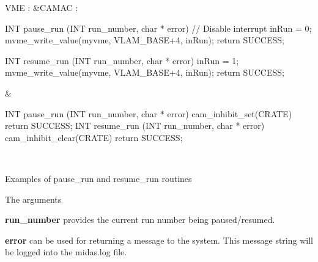 \begin{table}[h]\begin{TabularC}{2}
\hline
VME :  &CAMAC :  \\

\begin{DoxyCode}
INT pause_run (INT run_number, char * error)
{
 // Disable interrupt
  inRun = 0;
  mvme_write_value(myvme, VLAM_BASE+4, inRun);
   return SUCCESS;
}

INT resume_run (INT run_number, char * error)
{
 inRun = 1;
 mvme_write_value(myvme, VLAM_BASE+4, inRun);
   return SUCCESS;
}
\end{DoxyCode}
  &
\begin{DoxyCode}
INT pause_run (INT run_number, char * error)
{
   cam_inhibit_set(CRATE)
   return SUCCESS;
}
INT resume_run (INT run_number, char * error)
{
   cam_inhibit_clear(CRATE)
   return SUCCESS;
}  
\end{DoxyCode}


\\
\end{TabularC}
\centering
\caption{Examples of pause\_\-run and resume\_\-run routines }
\end{table}


The arguments
\begin{DoxyItemize}
\item {\bfseries run\_\-number} provides the current run number being paused/resumed.
\item {\bfseries error} can be used for returning a message to the system. This message string will be logged into the midas.log file.
\end{DoxyItemize}

\par


